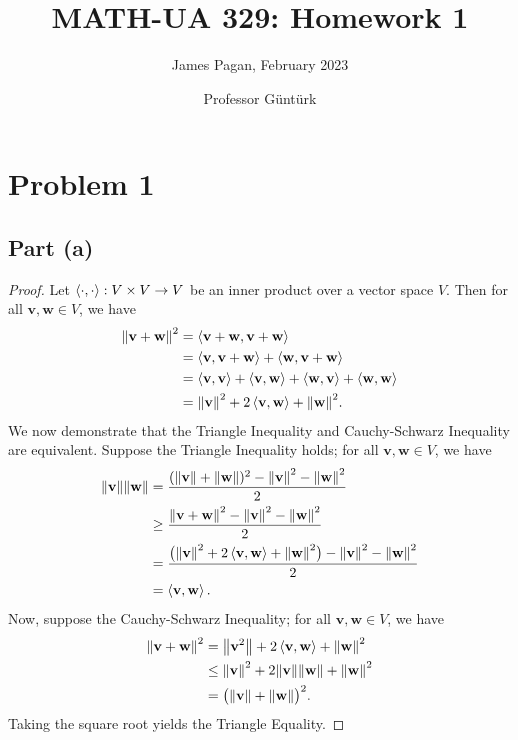\documentclass[11pt]{article}
\title{MATH-UA 329: Homework 1}
\author{James Pagan, February 2023}
\date{Professor Güntürk}
\renewcommand{\vec}[1]{\mathbf{#1}}
\begin{document}
\maketitle
\tableofcontents
\newpage


\section{Problem 1}


\subsection{Part (a)}

\begin{proof}
  Let $\ev{\cdot, \cdot} : V \times V \to V$ be an inner product over a vector space $V$. Then for all $\vec{v}, \vec{w} \in V$, we have
  \begin{align*}
    \norm{\vec{v} + \vec{w}}^{2} &= \ev{\vec{v} + \vec{w}, \vec{v} + \vec{w}} \\
                                 &= \ev{\vec{v}, \vec{v} + \vec{w}} + \ev{\vec{w}, \vec{v} + \vec{w}} \\
                                 &= \ev{\vec{v}, \vec{v}} + \ev{\vec{v}, \vec{w}} + \ev{\vec{w}, \vec{v}} + \ev{\vec{w}, \vec{w}} \\
                                 &= \norm{\vec{v}}^{2} + 2\ev{\vec{v}, \vec{w}} + \norm{\vec{w}}^{2}.
  \end{align*}
  We now demonstrate that the Triangle Inequality and Cauchy-Schwarz Inequality are equivalent. Suppose the Triangle Inequality holds; for all $\vec{v}, \vec{w} \in V$, we have
  \begin{align*}
   \norm{\vec{v}} \norm{\vec{w}} &= \frac{(\norm{\vec{v}} + \norm{\vec{w}})^{2} - \norm{\vec{v}}^{2} - \norm{\vec{w}}^{2}}{2} \\
                                 &\ge \frac{\norm{\vec{v} + \vec{w}}^{2} - \norm{\vec{v}}^{2} - \norm{\vec{w}}^{2}}{2} \\
                                 &= \frac{\big( \norm{\vec{v}}^{2} + 2 \ev{\vec{v}, \vec{w}} + \norm{\vec{w}}^{2} \big) - \norm{\vec{v}}^{2} - \norm{\vec{w}}^{2}}{2} \\
                                 &= \ev{\vec{v}, \vec{w}}.
  \end{align*}
  Now, suppose the Cauchy-Schwarz Inequality; for all $\vec{v}, \vec{w} \in V$, we have
  \begin{align*}
    \norm{\vec{v} + \vec{w}}^{2} &= \norm{\vec{v}^{2}} + 2 \ev{\vec{v}, \vec{w}} + \norm{\vec{w}}^{2} \\
                                 &\le \norm{\vec{v}}^{2} + 2 \norm{\vec{v}} \norm{\vec{w}} + \norm{\vec{w}}^{2} \\
                                 &= \big( \norm{\vec{v}} + \norm{\vec{w}} \big)^{2}.
  \end{align*}
  Taking the square root yields the Triangle Equality.
\end{proof}
\end{document}
